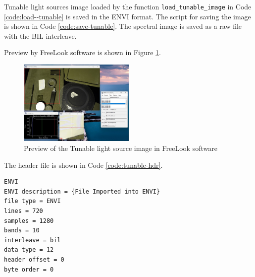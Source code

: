 Tunable light sources image loaded by the function \texttt{load\_tunable\_image} in Code \ref{code:load--tunable} is saved in the ENVI format.
The script for saving the image is shown in Code \ref{code:save-tunable}.
The spectral image is saved as a raw file with the BIL interleave. 

Preview by FreeLook software is shown in Figure \ref{fig:tunable-preview}.
\begin{figure}[H]
    \centering
    \caption{Preview of the Tunable light source image in FreeLook software}
    \label{fig:tunable-preview}
    \includegraphics[width=0.5\textwidth]{./fig-task3/tunable.jpg}
\end{figure}

The header file is shown in Code \ref{code:tunable-hdr}.

\begin{lstlisting}[caption=Saved ENVI header file, label={code:tunable-hdr}]
ENVI
ENVI description = {File Imported into ENVI}
file type = ENVI
lines = 720
samples = 1280
bands = 10
interleave = bil
data type = 12
header offset = 0
byte order = 0

\end{lstlisting}